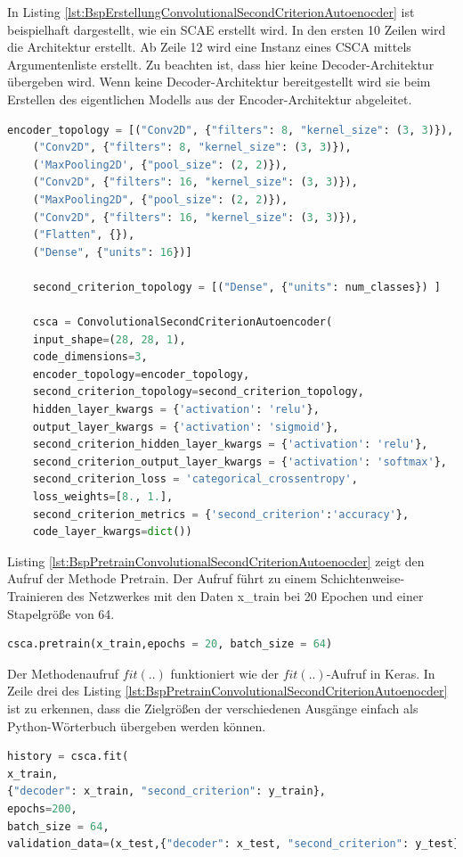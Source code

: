     In Listing \ref{lst:BspErstellungConvolutionalSecondCriterionAutoenocder} ist beispielhaft dargestellt, wie ein SCAE erstellt wird. In den ersten 10 Zeilen wird die Architektur erstellt. Ab Zeile 12 wird eine Instanz eines CSCA mittels Argumentenliste erstellt. Zu beachten ist, dass hier keine Decoder-Architektur übergeben wird. Wenn keine Decoder-Architektur bereitgestellt wird sie beim Erstellen des eigentlichen Modells aus der Encoder-Architektur abgeleitet.
	\begin{lstlisting}[language=python,caption=Beispiel Erstellung ConvolutionalSecondCriterionAutoenocder in Python, label=lst:BspErstellungConvolutionalSecondCriterionAutoenocder]
	encoder_topology = [("Conv2D", {"filters": 8, "kernel_size": (3, 3)}),
	("Conv2D", {"filters": 8, "kernel_size": (3, 3)}),
	('MaxPooling2D', {"pool_size": (2, 2)}),
	("Conv2D", {"filters": 16, "kernel_size": (3, 3)}),
	("MaxPooling2D", {"pool_size": (2, 2)}),
	("Conv2D", {"filters": 16, "kernel_size": (3, 3)}),
	("Flatten", {}),
	("Dense", {"units": 16})]

	second_criterion_topology = [("Dense", {"units": num_classes}) ]

	csca = ConvolutionalSecondCriterionAutoencoder(
	input_shape=(28, 28, 1),	
	code_dimensions=3, 
	encoder_topology=encoder_topology,
	second_criterion_topology=second_criterion_topology,
	hidden_layer_kwargs = {'activation': 'relu'},
	output_layer_kwargs = {'activation': 'sigmoid'},
	second_criterion_hidden_layer_kwargs = {'activation': 'relu'},
	second_criterion_output_layer_kwargs = {'activation': 'softmax'},
	second_criterion_loss = 'categorical_crossentropy',
	loss_weights=[8., 1.],
	second_criterion_metrics = {'second_criterion':'accuracy'},
	code_layer_kwargs=dict())
	\end{lstlisting}
Listing  \ref{lst:BspPretrainConvolutionalSecondCriterionAutoenocder}  zeigt den Aufruf der Methode Pretrain. Der Aufruf führt zu einem Schichtenweise-Trainieren des Netzwerkes mit den Daten x\_train bei 20 Epochen und einer Stapelgröße von 64. 
\begin{lstlisting}[language=python,caption=Beispielaufruf Pretrain  in Python, label=lst:BspPretrainConvolutionalSecondCriterionAutoenocder]
csca.pretrain(x_train,epochs = 20, batch_size = 64)
\end{lstlisting}

Der Methodenaufruf $fit(..)$ funktioniert wie der $fit(..)$-Aufruf in Keras. In Zeile drei des Listing  \ref{lst:BspPretrainConvolutionalSecondCriterionAutoenocder}  ist zu erkennen, dass die Zielgrößen der verschiedenen Ausgänge einfach als Python-Wörterbuch übergeben werden können.
\begin{lstlisting}[language=python,caption=Beispielaufruf Fit  in Python, label=lst:BspFitConvolutionalSecondCriterionAutoenocder]
history = csca.fit(
x_train,
{"decoder": x_train, "second_criterion": y_train}, 
epochs=200,
batch_size = 64,
validation_data=(x_test,{"decoder": x_test, "second_criterion": y_test}))
\end{lstlisting}


